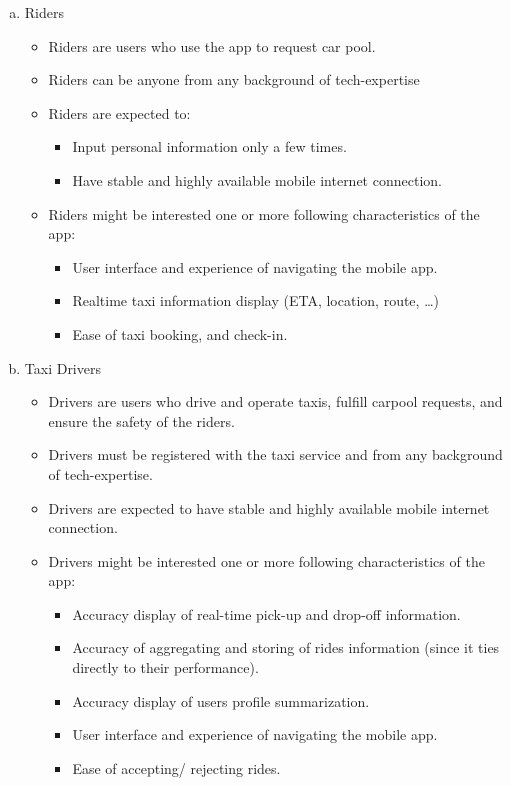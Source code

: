 \documentclass[]{article}
\begin{document}
\begin{enumerate}[a)]
	\item Riders
	\begin{itemize}
		\item Riders are users who use the app to request car pool.
		\item Riders can be anyone from any background of tech-expertise
		\item Riders are expected to:
		\begin{itemize}
			\item Input personal information only a few times.
			\item Have stable and highly available mobile internet connection.
		\end{itemize}
		
		\item Riders might be interested one or more following characteristics of the app:
		\begin{itemize}
			\item User interface and experience of navigating the mobile app.
			\item Realtime taxi information display (ETA, location, route, …)
			\item Ease of taxi booking, and check-in.  
		\end{itemize}
	\end{itemize}
	
	\item Taxi Drivers
	\begin{itemize}
		\item Drivers are users who drive and operate taxis, fulfill carpool requests, and ensure the safety of the riders.
		\item Drivers must be registered with the taxi service and from any background of tech-expertise.  
		\item Drivers are expected to have stable and highly available mobile internet connection.
		\item Drivers might be interested one or more following characteristics of the app:
		\begin{itemize}
			\item Accuracy display of real-time pick-up and drop-off information.
			\item Accuracy of aggregating and storing of rides information (since it ties directly to their performance).
			\item Accuracy display of user\textquotesingle s profile summarization.
			\item User interface and experience of navigating the mobile app.
			\item Ease of accepting/ rejecting rides.
		\end{itemize}

	\end{itemize}

\end{enumerate}
\end{document}
